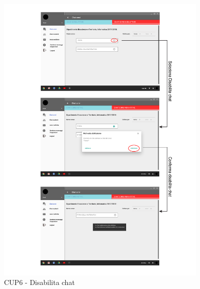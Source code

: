 \begin{figure}
	\centering
	\includegraphics[width=0.9\textwidth]{imgs/gruppo6/activities/act_cup6_disabilita_chat.pdf}
	\caption{CUP6 - Disabilita chat}
	\label{fig:act-cup6}
\end{figure}

